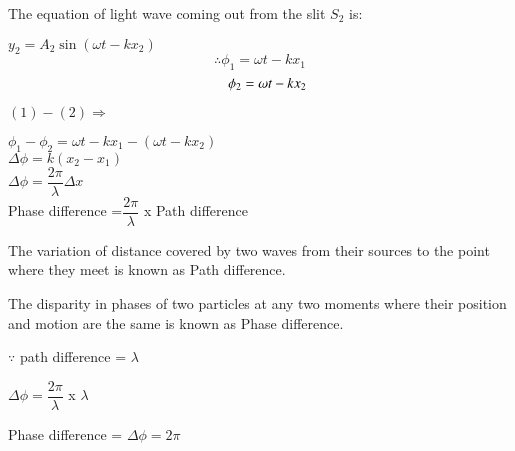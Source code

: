 \documentclass[journal,12pt,twocolumn]{IEEEtran}
\theoremstyle{remark}
\begin{document}
 \vspace{0.3cm}

The equation of light wave coming out from the slit $S_2$ is:

\vspace{0.2cm}

 \hspace*{1.3cm}  $y_2 = A_2\sin{(\omega t - kx_2)}$
\hspace{0.3cm}
\begin{equation}
 \therefore \phi_1 = \omega t - kx_1 
\end{equation}
\begin{equation}
\hspace*{0.4cm} \phi_2 = \omega t - kx_2 
\end{equation}

$ (1) - (2)  \Rightarrow{}$

\hspace*{0.3cm}$\phi_1 - \phi_2 = \omega t - kx_1 -( \omega t - kx_2 )$ \\ 

\hspace{0.3cm}$ \Delta \phi = k(x_2 - x_1) $ \\

\hspace{0.3cm}$ \Delta \phi = \dfrac{2\pi}{\lambda}\Delta x$ \\ 
\hspace{0.3cm} Phase difference =$\dfrac{2\pi}{\lambda}$ x Path difference

\vspace{0.2cm}

The variation of distance covered by two waves from their sources to the point where they meet is known as Path difference.

The disparity in phases of two particles at any two moments where their position and motion are the same is known as Phase difference.

$\because$ path difference = $\lambda$

\vspace{0.2cm}

\hspace{1cm}$\Delta \phi = \dfrac{2\pi}{\lambda}$  x  $\lambda$

\vspace{0.2cm}

Phase difference = $\Delta \phi = 2\pi$


      \vspace{0.2cm}
\end{document}
